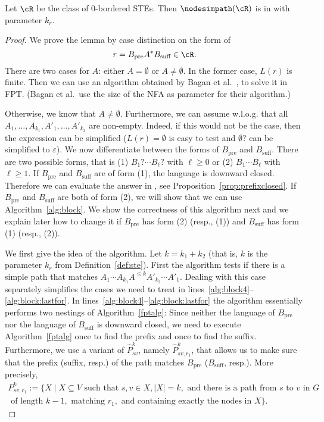 \documentclass[a4paper,english]{lipics-v2016}
\theoremstyle{plain}
\begin{document}
\begin{lemma} \label{lemma:0crit}
  Let $\cR$ be the class of 0-bordered STEs. Then
  $\nodesimpath(\cR)$ is in \fpt with parameter $k_r$.
\end{lemma}
\begin{proof}
  We prove the lemma by case distinction on the form of $$r =
  B_\text{pre} A^* B_\text{suff} \in \cR.$$ There are two cases for $A$:
  either $A = \emptyset$ or $A \neq \emptyset$. In the former case,
  $L(r)$ is finite. Then we can use an algorithm obtained by 
  Bagan et al.~\cite[Theorem 6, Corollary 2]{bagan}, to solve it in
  FPT. (Bagan et al.\ use the size of the NFA as parameter for their
  algorithm.)
  
  Otherwise, we know that $A \neq \emptyset$. Furthermore, we can
  assume \mbox{w.l.o.g.} that all $A_1,\ldots, \allowbreak A_{k_1}, \allowbreak A'_{1},\ldots,
  A'_{k_2}$ are non-empty. Indeed, if this would not be the case,
  then the expression can be simplified ($L(r) = \emptyset$ is easy to
  test and $\emptyset ?$ can be simplified to $\varepsilon$).  We now
  differentiate between the forms of $B_\text{pre}$ and
  $B_\text{suff}$. There are two possible forms, that is (1) $B_1?
  \cdots B_{\ell}?$ with $\ell \geq 0$ or (2) $B_1 \cdots B_{\ell}$
  with $\ell \geq 1$. If
  $B_\text{pre}$ and $B_\text{suff}$ are of form (1), the language is
  downward closed. Therefore we can evaluate the answer in \ptime, see
  Proposition~\ref{prop:prefixclosed}.  If $B_\text{pre}$ and
  $B_\text{suff}$ are both of form (2), we will show that we can use
  Algorithm~\ref{alg:block}.  We show the correctness of this
  algorithm next and we explain later how to change it if
  $B_\text{pre}$ has form (2) (resp., (1)) and $B_\text{suff}$ has
  form (1) (resp., (2)).

  We first give the idea of the algorithm. Let $k = k_1 + k_2$ (that
  is, $k$ is the parameter $k_r$ from Definition~\ref{def:ste}).
   First the algorithm tests
  if there is a simple path that matches $A_1 \cdots A_{k_1} A^{\leq
    k} A'_{k_2} \cdots A'_1$. Dealing with this case separately
  simplifies the cases we need to treat in
  lines~\ref{alg:block4}--\ref{alg:block:lastfor}. In
  lines~\ref{alg:block4}--\ref{alg:block:lastfor} the algorithm
  essentially performs two nestings of Algorithm~\ref{fptalg}: Since
  neither the language of $B_\text{pre}$ nor the language of
  $B_\text{suff}$ is downward closed, we need to execute
  Algorithm~\ref{fptalg} once to find the prefix and once to find the
  suffix. Furthermore, we use a variant of $\hat{P}^k_{sv}$, namely
  $\hat{P}^k_{sv,r_1}$, that allows us to make sure that the prefix
  (suffix, resp.) of the path matches $B_\text{pre}$ ($B_\text{suff}$,
  resp.). More precisely, 
  \begin{multline*}
    P^{k}_{sv,r_1} := \{X \mid X\subseteq V \text{ such that } s,v \in X,
|X| = k, \text{ and there is a path from $s$ to $v$ in } G \\
 \text{ of length } k-1, \text{ matching } r_1,  \text{ and containing exactly the nodes in } X \}.
\end{multline*}



\end{proof}
\end{document}
